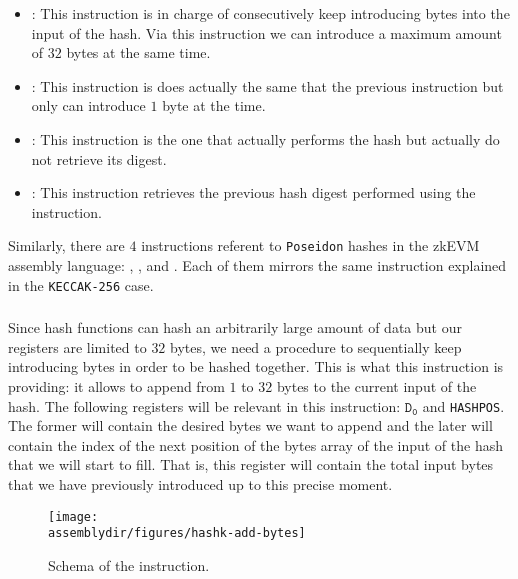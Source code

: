 \begin{itemize}
    
    \item \HASHK: This instruction is in charge of consecutively keep introducing bytes into the input of the hash. Via this instruction we can introduce a maximum amount of $32$ bytes at the same time. 
    
    \item \HASHKONE: This instruction is does actually the same that the previous instruction but only can introduce $1$ byte at the time. 
    
    \item \HASHKLEN: This instruction is the one that actually performs the hash but actually do not retrieve its digest. 
    
    \item \HASHKDIGEST: This instruction retrieves the previous hash digest performed using the \HASHKLEN instruction. 
    
\end{itemize}

Similarly, there are $4$ instructions referent to \texttt{Poseidon} hashes in the zkEVM assembly language: \HASHP, \HASHPONE, \HASHPLEN and \HASHPDIGEST. Each of them mirrors the same instruction explained in the \texttt{KECCAK-256} case. 



\subsubsection{\HASHK}

Since hash functions can hash an arbitrarily large amount of data but our registers are limited to $32$ bytes, we need a procedure to sequentially keep introducing bytes in order to be hashed together. This is what this instruction is providing: it allows to append from $1$ to $32$ bytes to the current input of the hash. The following registers will be relevant in this instruction: $\mathtt{D_0}$ and \texttt{HASHPOS}. The former will contain the desired bytes we want to append and the later will contain the index of the next position of the bytes array of the input of the hash that we will start to fill. That is, this register will contain the total input bytes that we have previously introduced up to this precise moment. 

\begin{figure}[H]
    \centering
    \texttt{[image: \\assemblydir/figures/hashk-add-bytes]}
    \caption{Schema of the \HASHK instruction.}
    \label{fig:hashk-add-bytes}
\end{figure}

